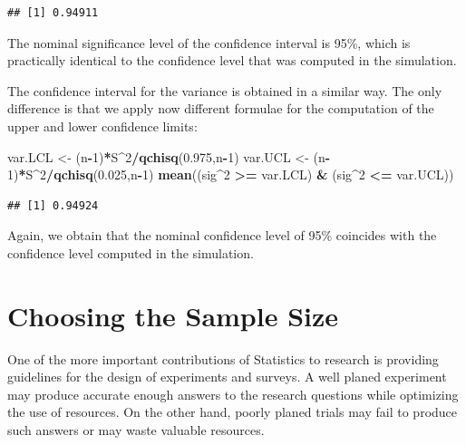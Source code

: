 \documentclass[]{krantz}
\makeatletter
\newenvironment{Shaded}{\begin{snugshade}}{\end{snugshade}}
\newcommand{\KeywordTok}[1]{\textcolor[rgb]{0.13,0.29,0.53}{\textbf{#1}}}
\newcommand{\DecValTok}[1]{\textcolor[rgb]{0.00,0.00,0.81}{#1}}
\newcommand{\FloatTok}[1]{\textcolor[rgb]{0.00,0.00,0.81}{#1}}
\newcommand{\StringTok}[1]{\textcolor[rgb]{0.31,0.60,0.02}{#1}}
\newcommand{\OperatorTok}[1]{\textcolor[rgb]{0.81,0.36,0.00}{\textbf{#1}}}
\newcommand{\NormalTok}[1]{#1}
\newenvironment{kframe}{%
\medskip{}
\setlength{\fboxsep}{.8em}
 \def\at@end@of@kframe{}%
 \ifinner\ifhmode%
  \def\at@end@of@kframe{\end{minipage}}%
  \begin{minipage}{\columnwidth}%
 \fi\fi%
 \def\FrameCommand##1{\hskip\@totalleftmargin \hskip-\fboxsep
 \colorbox{shadecolor}{##1}\hskip-\fboxsep
     \hskip-\linewidth \hskip-\@totalleftmargin \hskip\columnwidth}%
 \MakeFramed {\advance\hsize-\width
   \@totalleftmargin\z@ \linewidth\hsize
   \@setminipage}}%
 {\par\unskip\endMakeFramed%
 \at@end@of@kframe}
\renewenvironment{Shaded}{\begin{kframe}}{\end{kframe}}
\theoremstyle{definition}
\theoremstyle{definition}
\theoremstyle{definition}
\theoremstyle{remark}
\makeatother
\begin{document}
\begin{verbatim}
## [1] 0.94911
\end{verbatim}

The nominal significance level of the confidence interval is 95\%, which
is practically identical to the confidence level that was computed in
the simulation.

The confidence interval for the variance is obtained in a similar way.
The only difference is that we apply now different formulae for the
computation of the upper and lower confidence limits:

\begin{Shaded}
\begin{Highlighting}[]
\NormalTok{var.LCL <-}\StringTok{ }\NormalTok{(n}\OperatorTok{-}\DecValTok{1}\NormalTok{)}\OperatorTok{*}\NormalTok{S}\OperatorTok{^}\DecValTok{2}\OperatorTok{/}\KeywordTok{qchisq}\NormalTok{(}\FloatTok{0.975}\NormalTok{,n}\OperatorTok{-}\DecValTok{1}\NormalTok{)}
\NormalTok{var.UCL <-}\StringTok{ }\NormalTok{(n}\OperatorTok{-}\DecValTok{1}\NormalTok{)}\OperatorTok{*}\NormalTok{S}\OperatorTok{^}\DecValTok{2}\OperatorTok{/}\KeywordTok{qchisq}\NormalTok{(}\FloatTok{0.025}\NormalTok{,n}\OperatorTok{-}\DecValTok{1}\NormalTok{)}
\KeywordTok{mean}\NormalTok{((sig}\OperatorTok{^}\DecValTok{2} \OperatorTok{>=}\StringTok{ }\NormalTok{var.LCL) }\OperatorTok{&}\StringTok{ }\NormalTok{(sig}\OperatorTok{^}\DecValTok{2} \OperatorTok{<=}\StringTok{ }\NormalTok{var.UCL))}
\end{Highlighting}
\end{Shaded}

\begin{verbatim}
## [1] 0.94924
\end{verbatim}

Again, we obtain that the nominal confidence level of 95\% coincides
with the confidence level computed in the simulation.

\section{Choosing the Sample Size}\label{choosing-the-sample-size}

One of the more important contributions of Statistics to research is
providing guidelines for the design of experiments and surveys. A well
planed experiment may produce accurate enough answers to the research
questions while optimizing the use of resources. On the other hand,
poorly planed trials may fail to produce such answers or may waste
valuable resources.
\end{document}
